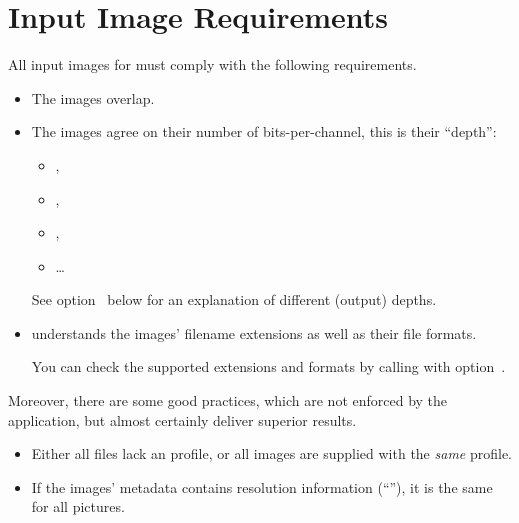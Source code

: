 

\section[Image Requirements]{\label{sec:image-requirements}%
  Input Image Requirements}

All input images for \App{} must comply with the following requirements.

\begin{itemize}
\item
  The images overlap.

\item
  The images agree on their number of bits-per-channel, this is their ``depth'':
  \begin{itemize}
  \item
    ,
  \item
    ,
  \item
    ,
  \item
    \dots
  \end{itemize}

  See option~ below for an explanation of different (output) depths.

\item
  \App{} understands the images' filename extensions as well as their file formats.

  You can check the supported extensions and formats by calling \App{} with
  option~.
\end{itemize}

Moreover, there are some good practices, which are not enforced by the application, but almost
certainly deliver superior results.

\begin{itemize}
\item
  Either all files lack an  profile, or all images are supplied with the
  \emph{same}  profile.

\item
  If the images' metadata contains resolution information (``''), it is the same
  for all pictures.
\end{itemize}


